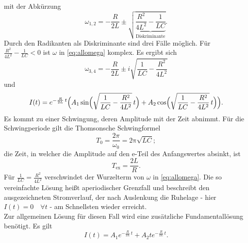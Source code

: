 mit der Abkürzung
\begin{equation}
	{\omega_{1,2}}= -\frac{{R}}{2{L}}\pm\sqrt{\underbrace{\frac{{R^2}}{4{L^2}}-\frac{1}{{LC}}}_{\text{Diskriminante}}}.
	\label{eq:allomega}
\end{equation}
Durch den Radikanten als Diskriminante sind drei Fälle möglich.
Für $\frac{{R^2}}{4{L^2}}-\frac{1}{{LC}}<0$ ist $\omega$ in \eqref{eq:allomega} komplex.
Es ergibt sich
\begin{equation}
	\mathup{\omega_{3,4}}= -\frac{{R}}{2{L}}\pm i\sqrt{\frac{1}{{LC}}-\frac{{R^2}}{4{L^2}}}
\end{equation}
und
\begin{equation}
	I(t) = e^{-\frac{{R}}{2{L}}\,t}\Bigl(A_1 \sin\Bigl(\sqrt{\frac{1}{{LC}}-\frac{{R^2}}{4{L^2}}}\, t\Bigr)+A_2 \cos\Bigl(\sqrt{\frac{1}{{LC}}-\frac{{R^2}}{4{L^2}}}\,t\Bigr)\Bigr).
	\label{eq:schwingloesung}
\end{equation}
Es kommt zu einer Schwingung, deren Amplitude mit der Zeit abnimmt. 
Für die Schwingperiode gilt die Thomsonsche Schwingformel
\begin{equation}
	T_0 = \frac{2π}{{ω_0}} = \mathup{2π} \sqrt{LC};
	\label{eq:thomson}
\end{equation} 
die Zeit, in welcher die Amplitude auf den e-Teil des Anfangswertes absinkt, ist
\begin{equation}
	T_\text{ex} = \frac{{2L}}{{R}}.
	\label{eq:abkling}
\end{equation}
Für $\frac{1}{{LC}}=\frac{{R^2}}{4{L^2}}$ 
verschwindet der Wurzelterm von $\omega$ in \eqref{eq:allomega}.
Die so vereinfachte Lösung heißt aperiodischer Grenzfall und beschreibt den ausgezeichneten Stromverlauf, der nach Auslenkung die Ruhelage - hier $I(t)=0 \quad\forall t$ - am Schnellsten wieder erreicht.\\
Zur allgemeinen Lösung für diesen Fall wird eine zusätzliche Fundamentallösung benötigt.
Es gilt
\begin{equation}
	I(t) = A_1 e^{-\frac{{R}}{2{L}}\,t}+A_2 t e^{-\frac{{R}}{2{L}}\,t}.
\end{equation}
